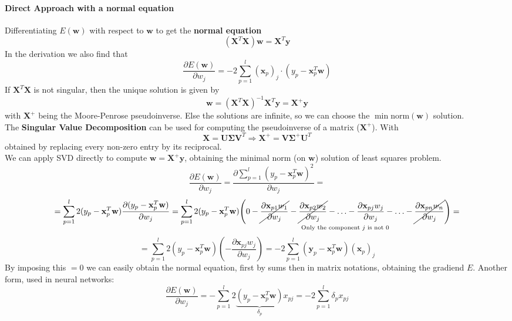 \documentclass[10pt]{report}
\begin{document}
\paragraph{Direct Approach with a normal equation} Differentiating $E(\mathbf{w})$ with respect to $\mathbf{w}$ to get the \textbf{normal equation} $$(\mathbf{X}^T \mathbf{X})\mathbf{w} = \mathbf{X}^T \mathbf{y}$$
In the derivation we also find that $$\frac{\partial E(\mathbf{w})}{\partial w_j} = -2 \sum_{p=1}^l (\mathbf{x}_p)_j \cdot (y_p - \mathbf{x}_p^T \mathbf{w})$$
If $\mathbf{X}^T \mathbf{X}$ is not singular, then the unique solution is given by $$\mathbf{w} = (\mathbf{X}^T \mathbf{X})^{-1}\mathbf{X}^T \mathbf{y} = \mathbf{X}^+ \mathbf{y}$$ with $\mathbf{X}^+$ being the Moore-Penrose pseudoinverse. Else the solutions are infinite, so we can choose the $\min \text{norm}(\mathbf{w})$ solution.\\
The \textbf{Singular Value Decomposition} can be used for computing the pseudoinverse of a matrix ($\mathbf{X}^+$). With $$\mathbf{X} = \mathbf{U}\mathbf{\Sigma} \mathbf{V}^T \Rightarrow \mathbf{X}^+ = \mathbf{V}\mathbf{\Sigma}^+ \mathbf{U}^T$$ obtained by replacing every non-zero entry by its reciprocal.\\
We can apply SVD directly to compute $\mathbf{w} = \mathbf{X}^+ \mathbf{y}$, obtaining the minimal norm (on $\mathbf{w}$) solution of least squares problem.
$$\frac{\partial E(\mathbf{w})}{\partial w_j} = \frac{\partial \sum_{p=1}^l (y_p - \mathbf{x}_p^T \mathbf{w})^2}{\partial w_j} =$$
$$=\sum_{p=1}^l 2(y_p-\mathbf{x}_p^T\mathbf{w})\frac{\partial(y_p-\mathbf{x}_p^T\mathbf{w})}{\partial w_j} = \sum_{p=1}^l 2(y_p-\mathbf{x}_p^T\mathbf{w})\underset{\text{Only the component }j\text{ is not }0}{\left(0-\cancel{\frac{\partial\mathbf{x}_{p1}w_1}{\partial w_j}}-\cancel{\frac{\partial\mathbf{x}_{p2}w_2}{\partial w_j}}-\ldots-\frac{\partial\mathbf{x}_{pj}w_j}{\partial w_j}-\ldots-\cancel{\frac{\partial\mathbf{x}_{pn}w_n}{\partial w_j}}\right)}=$$
$$= \sum_{p=1}^l 2(y_p-\mathbf{x}_p^T\mathbf{w})\left(-\frac{\partial \mathbf{x}_{pj}w_j}{\partial w_j}\right)= -2 \sum_{p=1}^l (\mathbf{y}_p - \mathbf{x}_p^T \mathbf{w})(\mathbf{x}_p)_j$$
By imposing this $=0$ we can easily obtain the normal equation, first by sums then in matrix notations, obtaining the gradiend $E$. Another form, used in neural networks:
$$\frac{\partial E(\mathbf{w})}{\partial w_j}=-\sum_{p=1}^l 2 \underset{\delta_p}{\underbrace{(y_p-\mathbf{x}_p^T\mathbf{w})}} x_{pj} = -2\sum_{p=1}^l\delta_px_{pj}$$
\end{document}
